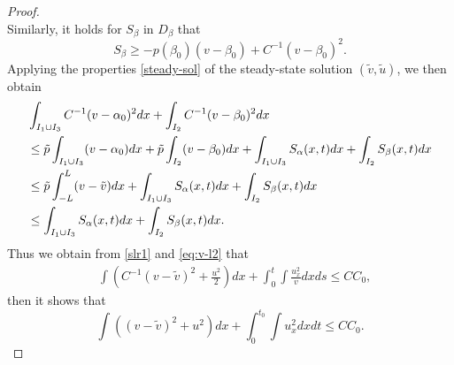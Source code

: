 \documentclass[a4paper,oneside,11pt]{article}
\numberwithin{equation}{section}
\begin{document}
\begin{proof}
\[\]
Similarly, it holds for \( S_{\beta} \) in \( D_{\beta} \) that
\[
S_\beta\geq -p(\beta_0)(v-\beta_0)+C^{-1}(v-\beta_0)^2.
\]
Applying the properties \eqref{steady-sol} of the steady-state solution \( (\tilde{v}, \tilde{u}) \), we then obtain
\begin{equation}\label{eq:v-l2}
\begin{aligned}
\displaystyle & \int_{I_1\cup I_3}C^{-1}(v-\alpha_0)^2dx+\int_{I_2}C^{-1}(v-\beta_0)^2dx\\
&\leq \tilde{p}\int_{I_1\cup I_3}(v-\alpha_0)dx+\tilde{p}\int_{I_2}(v-\beta_0)dx+\int_{I_1\cup I_3} S_\alpha(x, t) d x+\int_{I_2} S_\beta(x,t) d x\\
&\leq \tilde{p}\int_{-L}^{L}(v-\tilde{v})dx+\int_{I_1\cup I_3} S_\alpha(x, t) d x+\int_{I_2} S_\beta(x,t) d x\\
&\leq \int_{I_1\cup I_3} S_\alpha(x, t) d x+\int_{I_2} S_\beta(x,t) d x.
\end{aligned}  
\end{equation}
Thus we obtain from \eqref{slr1} and \eqref{eq:v-l2} that
 \begin{equation}\label{slr2}
\begin{aligned}
& \int\left(C^{-1}(v-\tilde{v})^2+\frac{u^2}{2}\right)d x+\int_0^t \int \frac{u_{x}^2}{v} d x d s \leq CC_0,
 \end{aligned}   
 \end{equation} 
then it shows that
 \begin{equation}\label{slr3}
\int\left((v-\tilde{v})^2+u^2\right)d x+\int_0^{t_0} \int u_{x}^2  d x d t\leq CC_0. 
 \end{equation} 



\end{proof}
\end{document}
